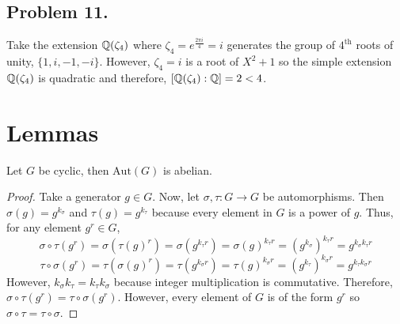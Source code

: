 \documentclass[12pt]{extarticle}
\begin{document}
\subsection*{Problem 11.}
Take the extension $\mathbb{Q}(\zeta_4)$ where $\zeta_4 = e^{\frac{2 \pi i}{4}} = i$ generates the group of $4^\mathrm{th}$ roots of unity, $\{1, i, -1, -i\}$. However, $\zeta_4 = i$ is a root of $X^2 + 1$ so the simple extension $\mathbb{Q}(\zeta_4)$ is quadratic and therefore, $[\mathbb{Q}(\zeta_4) : \mathbb{Q}] = 2 < 4$.

\section*{Lemmas}

\begin{lemma} \label{abelian}
Let $G$ be cyclic, then $\mathrm{Aut}(G)$ is abelian.
\end{lemma}
\begin{proof}
Take a generator $g \in G$. Now, let $\sigma, \tau : G \to G$ be automorphisms. Then $\sigma(g) = g^{k_\sigma}$ and $\tau(g) = g^{k_\tau}$ because every element in $G$ is a power of $g$. Thus, for any element $g^r \in G$,
\[\sigma \circ \tau(g^r) = \sigma(\tau(g)^r) = \sigma(g^{k_\tau r}) = \sigma(g)^{k_\tau r} = (g^{k_\sigma})^{k_\tau r} = g^{k_\sigma k_\tau r}\] 
\[\tau \circ \sigma(g^r) = \tau(\sigma(g)^r) = \tau(g^{k_\sigma r}) = \tau(g)^{k_\sigma r} = (g^{k_\tau})^{k_\sigma r} = g^{k_\tau k_\sigma r}\] 
However, $k_\sigma k_\tau = k_\tau k_\sigma$ because integer multiplication is commutative. Therefore, $\sigma \circ \tau(g^r) = \tau \circ \sigma(g^r)$. However, every element of $G$ is of the form $g^r$ so $\sigma \circ \tau = \tau \circ \sigma$. 
\end{proof}
\end{document}
